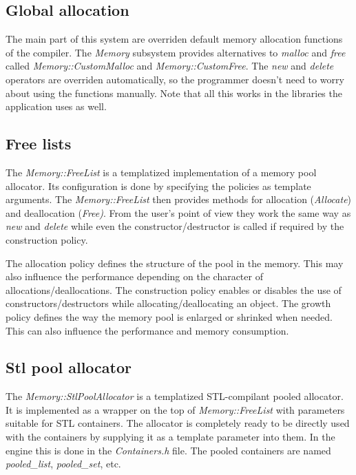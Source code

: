 \subsection{Global allocation}
The main part of this system are overriden default memory allocation functions of the compiler. The \emph{Memory} subsystem provides alternatives to \emph{malloc} and \emph{free} called \emph{Memory::CustomMalloc} and \emph{Memory::CustomFree}. The \emph{new} and \emph{delete} operators are overriden automatically, so the programmer doesn't need to worry about using the functions manually. Note that all this works in the libraries the application uses as well.


\subsection{Free lists}
The \emph{Memory::FreeList} is a templatized implementation of a memory pool allocator. Its configuration is done by specifying the policies as template arguments. The \emph{Memory::FreeList} then provides methods for allocation (\emph{Allocate}) and deallocation (\emph{Free)}. From the user's point of view they work the same way as \emph{new} and \emph{delete} while even the constructor/destructor is called if required by the construction policy.

The allocation policy defines the structure of the pool in the memory. This may also influence the performance depending on the character of allocations/deallocations. The construction policy enables or disables the use of constructors/destructors while allocating/deallocating an object. The growth policy defines the way the memory pool is enlarged or shrinked when needed. This can also influence the performance and memory consumption.


\subsection{Stl pool allocator}
The \emph{Memory::StlPoolAllocator} is a templatized STL-compilant pooled allocator. It is implemented as a wrapper on the top of \emph{Memory::FreeList} with parameters suitable for STL containers. The allocator is completely ready to be directly used with the containers by supplying it as a template parameter into them. In the engine this is done in the \emph{Containers.h} file. The pooled containers are named \emph{pooled\_list}, \emph{pooled\_set}, etc.


